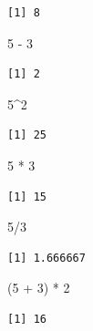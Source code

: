 \documentclass[
  letterpaper,
  DIV=11,
  numbers=noendperiod]{scrreprt}
\newenvironment{Shaded}{\begin{snugshade}}{\end{snugshade}}
\newcommand{\DecValTok}[1]{\textcolor[rgb]{0.68,0.00,0.00}{#1}}
\newcommand{\NormalTok}[1]{\textcolor[rgb]{0.00,0.23,0.31}{#1}}
\newcommand{\SpecialCharTok}[1]{\textcolor[rgb]{0.37,0.37,0.37}{#1}}
\begin{document}
\begin{verbatim}
[1] 8
\end{verbatim}

\begin{Shaded}
\begin{Highlighting}[]
\DecValTok{5} \SpecialCharTok{{-}} \DecValTok{3}
\end{Highlighting}
\end{Shaded}

\begin{verbatim}
[1] 2
\end{verbatim}

\begin{Shaded}
\begin{Highlighting}[]
\DecValTok{5}\SpecialCharTok{\^{}}\DecValTok{2}
\end{Highlighting}
\end{Shaded}

\begin{verbatim}
[1] 25
\end{verbatim}

\begin{Shaded}
\begin{Highlighting}[]
\DecValTok{5} \SpecialCharTok{*} \DecValTok{3}
\end{Highlighting}
\end{Shaded}

\begin{verbatim}
[1] 15
\end{verbatim}

\begin{Shaded}
\begin{Highlighting}[]
\DecValTok{5}\SpecialCharTok{/}\DecValTok{3}
\end{Highlighting}
\end{Shaded}

\begin{verbatim}
[1] 1.666667
\end{verbatim}

\begin{Shaded}
\begin{Highlighting}[]
\NormalTok{(}\DecValTok{5} \SpecialCharTok{+} \DecValTok{3}\NormalTok{) }\SpecialCharTok{*} \DecValTok{2}
\end{Highlighting}
\end{Shaded}

\begin{verbatim}
[1] 16
\end{verbatim}
\end{document}

